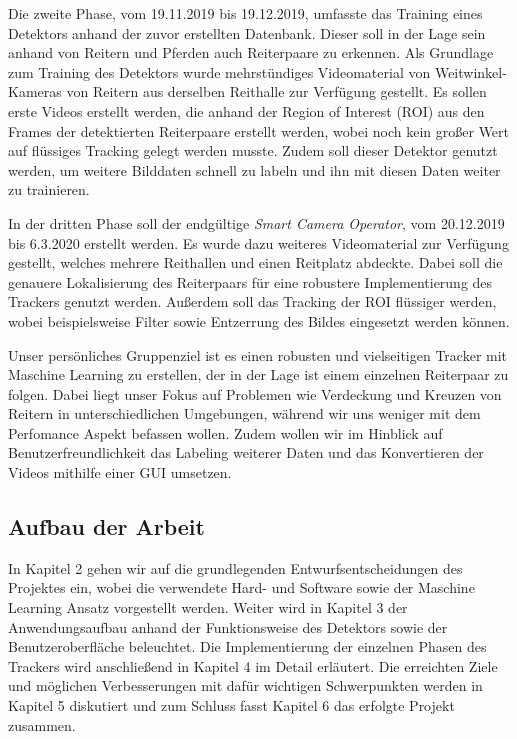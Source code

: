 Die zweite Phase, vom 19.11.2019 bis 19.12.2019, umfasste das Training eines Detektors anhand der zuvor erstellten Datenbank. Dieser soll in der Lage sein anhand von Reitern und Pferden auch Reiterpaare zu erkennen. Als Grundlage zum Training des Detektors wurde mehrstündiges Videomaterial von Weitwinkel-Kameras von Reitern aus derselben Reithalle zur Verfügung gestellt. Es sollen erste Videos erstellt werden, die anhand der Region of Interest (ROI) aus den Frames der detektierten Reiterpaare erstellt werden, wobei noch kein großer Wert auf flüssiges Tracking gelegt werden musste. Zudem soll dieser Detektor genutzt werden, um weitere Bilddaten schnell zu labeln und ihn mit diesen Daten weiter zu trainieren.

In der dritten Phase soll der endgültige \emph{Smart Camera Operator}, vom 20.12.2019 bis 6.3.2020 erstellt werden. Es wurde dazu weiteres Videomaterial zur Verfügung gestellt, welches mehrere Reithallen und einen Reitplatz abdeckte. Dabei soll die genauere Lokalisierung des Reiterpaars für eine robustere Implementierung des Trackers genutzt werden. Außerdem soll das Tracking der ROI flüssiger werden, wobei beispielsweise Filter sowie Entzerrung des Bildes eingesetzt werden können.

Unser persönliches Gruppenziel ist es einen robusten und vielseitigen Tracker mit Maschine Learning zu erstellen, der in der Lage ist einem einzelnen Reiterpaar zu folgen. Dabei liegt unser Fokus auf Problemen wie Verdeckung und Kreuzen von Reitern in unterschiedlichen Umgebungen, während wir uns weniger mit dem Perfomance Aspekt befassen wollen. Zudem wollen wir im Hinblick auf Benutzerfreundlichkeit das Labeling weiterer Daten und das Konvertieren der Videos mithilfe einer GUI umsetzen.




\subsection*{Aufbau der Arbeit}
In Kapitel 2 gehen wir auf die grundlegenden Entwurfsentscheidungen des Projektes ein, wobei die verwendete Hard- und Software sowie der Maschine Learning Ansatz vorgestellt werden. Weiter wird in Kapitel 3 der Anwendungsaufbau anhand der Funktionsweise des Detektors sowie der Benutzeroberfläche beleuchtet. Die Implementierung der einzelnen Phasen des Trackers wird anschließend in Kapitel 4 im Detail erläutert. Die erreichten Ziele und möglichen Verbesserungen mit dafür wichtigen Schwerpunkten werden in Kapitel 5 diskutiert und zum Schluss fasst Kapitel 6 das erfolgte Projekt zusammen.